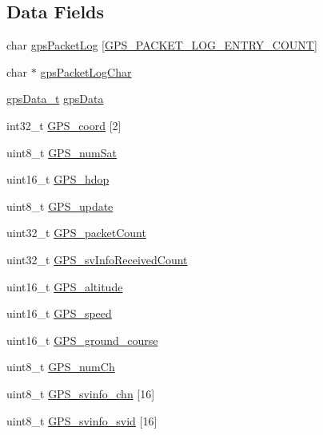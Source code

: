 \subsection*{Data Fields}
\begin{DoxyCompactItemize}
\item 
char \hyperlink{structgps_a1eb759a3e0ba730d081137ac256b76a7}{gps\+Packet\+Log} \mbox{[}\hyperlink{sensors_2gps_8h_ab49fbdbefeca0005095e8f3b45a0f7c8}{G\+P\+S\+\_\+\+P\+A\+C\+K\+E\+T\+\_\+\+L\+O\+G\+\_\+\+E\+N\+T\+R\+Y\+\_\+\+C\+O\+U\+N\+T}\mbox{]}
\item 
char $\ast$ \hyperlink{structgps_a1055c6f779022becba696e243dfcdca1}{gps\+Packet\+Log\+Char}
\item 
\hyperlink{sensors_2gps_8h_a771fa045adfa1095a89b83006e07478f}{gps\+Data\+\_\+t} \hyperlink{structgps_a20af1aa168a31776b9e035d9fd0c35e7}{gps\+Data}
\item 
int32\+\_\+t \hyperlink{structgps_ab71d92d4bd48f6caf45341214387c62c}{G\+P\+S\+\_\+coord} \mbox{[}2\mbox{]}
\item 
uint8\+\_\+t \hyperlink{structgps_ad259f63a95ceb187eee4f9835599faad}{G\+P\+S\+\_\+num\+Sat}
\item 
uint16\+\_\+t \hyperlink{structgps_a4379d92cd78226da2dadddf6441dc060}{G\+P\+S\+\_\+hdop}
\item 
uint8\+\_\+t \hyperlink{structgps_a52b1d84c34037315d1a42b6e154f5f0d}{G\+P\+S\+\_\+update}
\item 
uint32\+\_\+t \hyperlink{structgps_a1b4e17f4712e1f67f02b4e21d4f0e49d}{G\+P\+S\+\_\+packet\+Count}
\item 
uint32\+\_\+t \hyperlink{structgps_a4101a4980e857277766d889ae2905df6}{G\+P\+S\+\_\+sv\+Info\+Received\+Count}
\item 
uint16\+\_\+t \hyperlink{structgps_a6e61c7cefd9bf03f800785393686140a}{G\+P\+S\+\_\+altitude}
\item 
uint16\+\_\+t \hyperlink{structgps_a0a653a835ede96075609473cb7466d5a}{G\+P\+S\+\_\+speed}
\item 
uint16\+\_\+t \hyperlink{structgps_ae3f9e8d2bbd8f37022f85b543c06dbb8}{G\+P\+S\+\_\+ground\+\_\+course}
\item 
uint8\+\_\+t \hyperlink{structgps_a0d62935dcedc89bdfa083fcfb30c8166}{G\+P\+S\+\_\+num\+Ch}
\item 
uint8\+\_\+t \hyperlink{structgps_a9ea4a389a4deb33e1b49dcac3116480f}{G\+P\+S\+\_\+svinfo\+\_\+chn} \mbox{[}16\mbox{]}
\item 
uint8\+\_\+t \hyperlink{structgps_a50222126dec4301a4a6b87dfafd070ac}{G\+P\+S\+\_\+svinfo\+\_\+svid} \mbox{[}16\mbox{]}

\end{DoxyCompactItemize}
